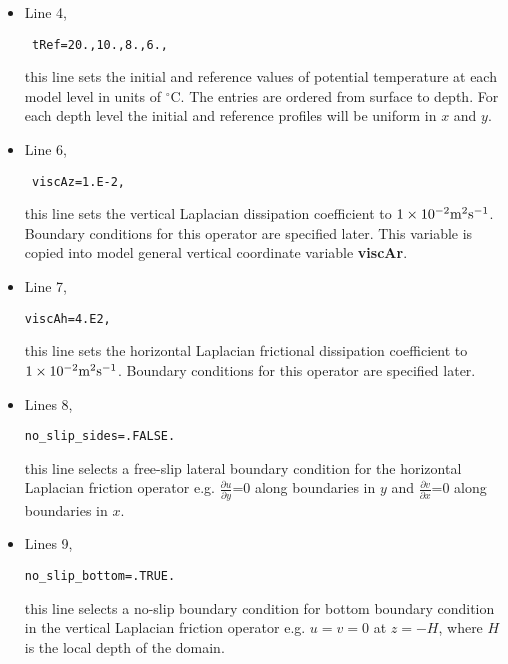 \begin{itemize}

\item Line 4, 
\begin{verbatim} tRef=20.,10.,8.,6., \end{verbatim} 
this line sets
the initial and reference values of potential temperature at each model
level in units of $^{\circ}$C.
The entries are ordered from surface to depth. For each
depth level the initial and reference profiles will be uniform in
$x$ and $y$.



\item Line 6, 
\begin{verbatim} viscAz=1.E-2, \end{verbatim} 
this line sets the vertical Laplacian dissipation coefficient to
$1 \times 10^{-2} {\rm m^{2}s^{-1}}$. Boundary conditions
for this operator are specified later. This variable is copied into
model general vertical coordinate variable {\bf viscAr}.


\item Line 7, 
\begin{verbatim}
viscAh=4.E2,
\end{verbatim} 
this line sets the horizontal Laplacian frictional dissipation coefficient to
$1 \times 10^{-2} {\rm m^{2}s^{-1}}$. Boundary conditions
for this operator are specified later.

\item Lines 8,
\begin{verbatim}
no_slip_sides=.FALSE.
\end{verbatim}
this line selects a free-slip lateral boundary condition for
the horizontal Laplacian friction operator 
e.g. $\frac{\partial u}{\partial y}$=0 along boundaries in $y$ and
$\frac{\partial v}{\partial x}$=0 along boundaries in $x$.

\item Lines 9,
\begin{verbatim}
no_slip_bottom=.TRUE.
\end{verbatim}
this line selects a no-slip boundary condition for bottom
boundary condition in the vertical Laplacian friction operator 
e.g. $u=v=0$ at $z=-H$, where $H$ is the local depth of the domain.


\end{itemize}

